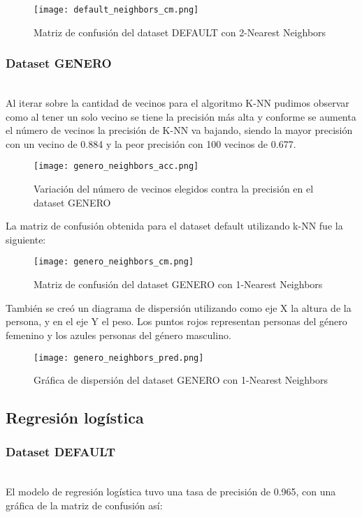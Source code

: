 \documentclass[sigconf,authorversion,nonacm]{acmart}
\begin{document}
\begin{figure}[H]
  \centering
  \texttt{[image: default\_neighbors\_cm.png]}
  \caption{Matriz de confusión del dataset DEFAULT con 2-Nearest Neighbors}
\end{figure}

\subsubsection{Dataset GENERO}\hfill\\
Al iterar sobre la cantidad de vecinos para el algoritmo K-NN pudimos observar como al tener un solo vecino se tiene la precisión más alta y conforme se aumenta el número de vecinos la precisión de K-NN va bajando, siendo la mayor precisión con un vecino de 0.884 y la peor precisión con 100 vecinos de 0.677.

\begin{figure}[H]
  \centering
  \texttt{[image: genero\_neighbors\_acc.png]}
  \caption{Variación del número de vecinos elegidos contra la precisión en el dataset GENERO}
\end{figure}

La matriz de confusión obtenida para el dataset default utilizando k-NN fue la siguiente:

\begin{figure}[H]
  \centering
  \texttt{[image: genero\_neighbors\_cm.png]}
  \caption{Matriz de confusión del dataset GENERO con 1-Nearest Neighbors}
\end{figure}

También se creó un diagrama de dispersión utilizando como eje X la altura de la persona, y en el eje Y el peso. Los puntos rojos representan personas del género femenino y los azules personas del género masculino.

\begin{figure}[H]
  \centering
  \texttt{[image: genero\_neighbors\_pred.png]}
  \caption{Gráfica de dispersión del dataset GENERO con 1-Nearest Neighbors}
\end{figure}

\subsection{Regresión logística}

\subsubsection{Dataset DEFAULT}\hfill\\
El modelo de regresión logística tuvo una tasa de precisión de 0.965, con una gráfica de la matriz de confusión así:
\end{document}
